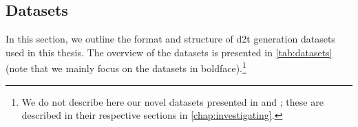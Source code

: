 {%


\subsection{Datasets}
\label{sec:datasets}

In this section, we outline the format and structure of \ac{d2t} generation datasets used in this thesis. The overview of the datasets is presented in \autoref{tab:datasets} (note that we mainly focus on the datasets in boldface).\footnote{We do not describe here our novel datasets presented in \citet{kasnerMindLabelsDescribing2022} and \citet{kasnerReferenceBasedMetricsAnalyzing2024}; these are described in their respective sections in \autoref{chap:investigating}.}

}
